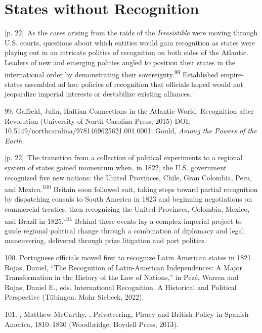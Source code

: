 \documentclass[10pt,a4paper]{article}
\begin{document}
\section*{States without Recognition}
{\scriptsize\color{gray} [p. 22]}\ As the cases arising from the raids of the \textit{Irresistible} were moving through U.S. courts, questions about which entities would gain recognition as states were playing out in an intricate politics of recognition on both sides of the Atlantic. Leaders of new and emerging polities angled to position their states in the international order by demonstrating their sovereignty.\nobreak\textsuperscript{99} Established empire-states assembled ad hoc policies of recognition that officials hoped would not jeopardize imperial interests or destabilize existing alliances.\par{\small 99. Gaffield, Julia, Haitian Connections in the Atlantic World: Recognition after Revolution (University of North Carolina Press, 2015) DOI: 10.5149/northcarolina/9781469625621.001.0001; Gould, \textit{Among the Powers of the Earth.}\par}
{\scriptsize\color{gray} [p. 22]}\ The transition from a collection of political experiments to a regional system of states gained momentum when, in 1822, the U.S. government recognized five new nations: the United Provinces, Chile, Gran Colombia, Peru, and Mexico.\nobreak\textsuperscript{100} Britain soon followed suit, taking steps toward partial recognition by dispatching consuls to South America in 1823 and beginning negotiations on commercial treaties, then recognizing the United Provinces, Colombia, Mexico, and Brazil in 1825.\nobreak\textsuperscript{101} Behind these events lay a complex imperial project to guide regional political change through a combination of diplomacy and legal maneuvering, delivered through prize litigation and port politics.\par{\small 100. Portuguese officials moved first to recognize Latin American states in 1821. Rojas, Daniel, “The Recognition of Latin-American Independences: A Major Transformation in the History of the Law of Nations,” in Pezé, Warren and Rojas, Daniel E., eds. International Recognition. A Historical and Political Perspective (Tübingen: Mohr Siebeck, 2022).\par}{\small 101. , Matthew McCarthy, , Privateering, Piracy and British Policy in Spanish America, 1810–1830 (Woodbridge: Boydell Press, 2013).\par}
\end{document}
